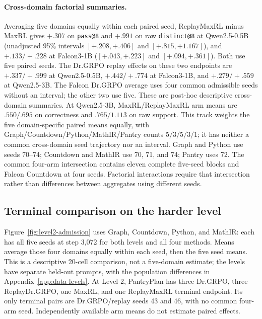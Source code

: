 \documentclass{article}
\newcommand{\1}{\mathbf 1}
\theoremstyle{remark}
\theoremstyle{definition}
\theoremstyle{plain}
\begin{document}
\paragraph{Cross-domain factorial summaries.}
\label{app:factorial-numerical-detail}
Averaging five domains equally within each paired seed, ReplayMaxRL minus
MaxRL gives $+.307$ on \texttt{pass@8} and $+.991$ on raw
\texttt{distinct@8} at Qwen2.5-0.5B (unadjusted 95\% intervals
$[+.208,+.406]$ and $[+.815,+1.167]$), and $+.133/+.228$ at Falcon3-1B
($[+.043,+.223]$ and $[+.094,+.361]$). Both use five paired seeds.
The Dr.GRPO replay effects on these two endpoints are $+.337/+.999$ at
Qwen2.5-0.5B, $+.442/+.774$ at Falcon3-1B, and $+.279/+.559$ at
Qwen2.5-3B. The Falcon Dr.GRPO average uses four common admissible seeds
without an interval; the other two use five. These are post-hoc descriptive
cross-domain summaries. At Qwen2.5-3B, MaxRL/ReplayMaxRL arm means are
$.550/.695$ on correctness and $.765/1.113$ on raw support. This track
weights the five domain-specific paired means equally, with
Graph/Countdown/Python/MathIR/Pantry counts $5/3/5/3/1$; it has neither a
common cross-domain seed trajectory nor an interval. Graph and Python use
seeds 70--74; Countdown and MathIR use 70, 71, and 74; Pantry uses 72.
The common four-arm
intersection contains eleven complete five-seed blocks and Falcon Countdown
at four seeds. Factorial interactions require that intersection rather than
differences between aggregates using different seeds.


\subsection{Terminal comparison on the harder level}
\label{app:level2-interim}

Figure~\ref{fig:level2-admission} uses Graph, Countdown, Python, and MathIR:
each has all five seeds at step 3,072 for both levels and all four methods.
Means average those four domains equally within each seed, then the five
seed means. This is a descriptive 20-cell comparison, not a five-domain
estimate; the levels have separate held-out prompts, with the population
differences in Appendix~\ref{app:data-levels}. At Level 2,
PantryPlan has three Dr.GRPO, three ReplayDr.GRPO, one MaxRL, and one
ReplayMaxRL terminal endpoint. Its only terminal pairs are Dr.GRPO/replay
seeds 43 and 46, with no common four-arm seed. Independently available
arm means do not estimate paired effects.
\end{document}
